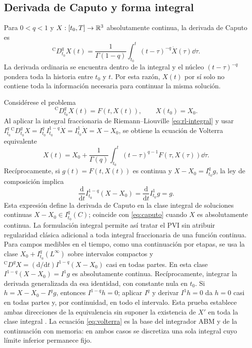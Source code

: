 \subsection{Derivada de Caputo y forma integral}

Para \(0<q<1\) y \(X:[t_0,T]\to\mathbb{R}^3\) absolutamente continua, la derivada de
Caputo es
\begin{equation}
{}^{\mathrm C}D_{t_0}^{q}X(t)
=\frac{1}{\Gamma(1-q)}
\int_{t_0}^{t}(t-\tau)^{-q}\dot X(\tau)\dd\tau.
\label{eq:caputo}
\end{equation}
La derivada ordinaria se encuentra dentro de la integral y el núcleo
\((t-\tau)^{-q}\) pondera toda la historia entre \(t_0\) y \(t\). Por esta
razón, \(X(t)\) por sí solo no contiene toda la información necesaria para
continuar la misma solución.

Considérese el problema
\begin{equation}
{}^{\mathrm C}D_{t_0}^{q}X(t)=F(t,X(t)),
\qquad X(t_0)=X_0.
\label{eq:pvi_caputo}
\end{equation}
Al aplicar la integral fraccionaria de Riemann--Liouville
\cref{eq:rl-integral}
y usar
\(I_{t_0}^{q}{}^{\mathrm C}D_{t_0}^{q}X
=I_{t_0}^{q}I_{t_0}^{1-q}\dot X
=I_{t_0}^{1}\dot X=X-X_0\), se obtiene la
ecuación de Volterra equivalente
\begin{equation}
X(t)=X_0+\frac{1}{\Gamma(q)}
\int_{t_0}^{t}(t-\tau)^{q-1}F(\tau,X(\tau))\dd\tau.
\label{eq:volterra}
\end{equation}
Recíprocamente, si \(g(t)=F(t,X(t))\) es continua y
\(X-X_0=I_{t_0}^qg\), la ley de composición implica
\[
 \frac{\mathrm d}{\mathrm dt}I_{t_0}^{1-q}(X-X_0)
 =\frac{\mathrm d}{\mathrm dt}I_{t_0}^{1}g=g.
\]
Esta expresión define la derivada de Caputo en la clase integral de
soluciones continuas \(X-X_0\in I_{t_0}^q(C)\); coincide con
\eqref{eq:caputo} cuando \(X\) es absolutamente continua.
La formulación integral permite así tratar el PVI sin atribuir regularidad
clásica adicional a toda integral fraccionaria de una función continua.
Para campos medibles en el tiempo, como una continuación por etapas,
se usa la clase $X_0+I_{t_0}^q(L^\infty)$ sobre intervalos compactos y
${}^{\mathrm C}D^qX=(\mathrm d/\mathrm dt)I^{1-q}(X-X_0)$ casi en todas
partes. En esta clase $I^{1-q}(X-X_0)=I^1g$ es absolutamente continua.
Recíprocamente, integrar la derivada generalizada da esa identidad, con
constante nula en $t_0$. Si $h=X-X_0-I^qg$, entonces $I^{1-q}h=0$;
aplicar $I^q$ y derivar $I^1h=0$ da $h=0$ casi en todas partes y, por
continuidad, en todo el intervalo. Esta prueba establece ambas direcciones
de la equivalencia sin suponer la existencia de $X'$ en toda la clase integral
\cite{Gomoyunov2018Convex}.
La ecuación \eqref{eq:volterra} es la base del integrador ABM y de la continuación con memoria:
en ambos casos se discretiza una sola integral cuyo límite inferior permanece
fijo.

